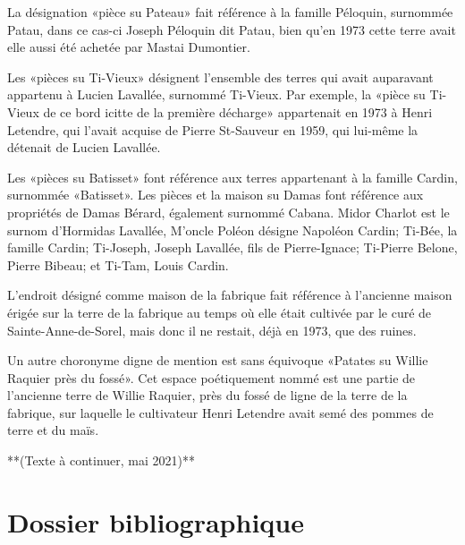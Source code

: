 \documentclass[12pt]{report}
\begin{document}
La désignation «pièce su Pateau» fait référence à la famille Péloquin, surnommée Patau, dans ce cas-ci Joseph Péloquin dit Patau, bien qu’en 1973 cette terre avait elle aussi été achetée par Mastai Dumontier.

Les «pièces su Ti-Vieux» désignent l’ensemble des terres qui avait auparavant appartenu à Lucien Lavallée, surnommé Ti-Vieux. Par exemple, la «pièce su Ti-Vieux de ce bord icitte de la première décharge» appartenait en 1973 à Henri Letendre, qui l’avait acquise de Pierre St-Sauveur en 1959, qui lui-même la détenait de Lucien Lavallée.

Les «pièces su Batisset» font référence aux terres appartenant à la famille Cardin, surnommée «Batisset». Les pièces et la maison su Damas font référence aux propriétés de Damas Bérard, également surnommé Cabana. Midor Charlot est le surnom d’Hormidas Lavallée, M’oncle Poléon désigne Napoléon Cardin; Ti-Bée, la famille Cardin; Ti-Joseph, Joseph Lavallée, fils de Pierre-Ignace; Ti-Pierre Belone, Pierre Bibeau; et Ti-Tam, Louis Cardin.

L’endroit désigné comme maison de la fabrique fait référence à l’ancienne maison érigée sur la terre de la fabrique au temps où elle était cultivée par le curé de Sainte-Anne-de-Sorel, mais donc il ne restait, déjà en 1973, que des ruines.

Un autre choronyme digne de mention est sans équivoque «Patates su Willie Raquier près du fossé». Cet espace poétiquement nommé est une partie de l’ancienne terre de Willie Raquier, près du fossé de ligne de la terre de la fabrique, sur laquelle le cultivateur Henri Letendre avait semé des pommes de terre et du maïs.

**(Texte à continuer, mai 2021)**





\appendix
\chapter*{Dossier bibliographique}
\end{document}
